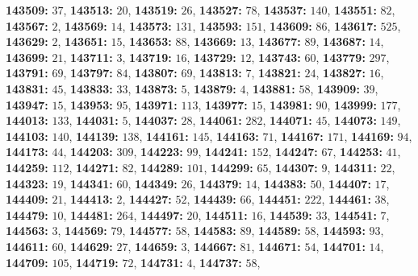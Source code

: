 \textsf{\bfseries 143509:} $37$, \textsf{\bfseries 143513:} $20$, \textsf{\bfseries 143519:} $26$, \textsf{\bfseries 143527:} $78$, \textsf{\bfseries 143537:} $140$, \textsf{\bfseries 143551:} $82$, \textsf{\bfseries 143567:} $2$, \textsf{\bfseries 143569:} $14$, \textsf{\bfseries 143573:} $131$, \textsf{\bfseries 143593:} $151$, \textsf{\bfseries 143609:} $86$, \textsf{\bfseries 143617:} $525$, \textsf{\bfseries 143629:} $2$, \textsf{\bfseries 143651:} $15$, \textsf{\bfseries 143653:} $88$, \textsf{\bfseries 143669:} $13$, \textsf{\bfseries 143677:} $89$, \textsf{\bfseries 143687:} $14$, \textsf{\bfseries 143699:} $21$, \textsf{\bfseries 143711:} $3$, \textsf{\bfseries 143719:} $16$, \textsf{\bfseries 143729:} $12$, \textsf{\bfseries 143743:} $60$, \textsf{\bfseries 143779:} $297$, \textsf{\bfseries 143791:} $69$, \textsf{\bfseries 143797:} $84$, \textsf{\bfseries 143807:} $69$, \textsf{\bfseries 143813:} $7$, \textsf{\bfseries 143821:} $24$, \textsf{\bfseries 143827:} $16$, \textsf{\bfseries 143831:} $45$, \textsf{\bfseries 143833:} $33$, \textsf{\bfseries 143873:} $5$, \textsf{\bfseries 143879:} $4$, \textsf{\bfseries 143881:} $58$, \textsf{\bfseries 143909:} $39$, \textsf{\bfseries 143947:} $15$, \textsf{\bfseries 143953:} $95$, \textsf{\bfseries 143971:} $113$, \textsf{\bfseries 143977:} $15$, \textsf{\bfseries 143981:} $90$, \textsf{\bfseries 143999:} $177$, \textsf{\bfseries 144013:} $133$, \textsf{\bfseries 144031:} $5$, \textsf{\bfseries 144037:} $28$, \textsf{\bfseries 144061:} $282$, \textsf{\bfseries 144071:} $45$, \textsf{\bfseries 144073:} $149$, \textsf{\bfseries 144103:} $140$, \textsf{\bfseries 144139:} $138$, \textsf{\bfseries 144161:} $145$, \textsf{\bfseries 144163:} $71$, \textsf{\bfseries 144167:} $171$, \textsf{\bfseries 144169:} $94$, \textsf{\bfseries 144173:} $44$, \textsf{\bfseries 144203:} $309$, \textsf{\bfseries 144223:} $99$, \textsf{\bfseries 144241:} $152$, \textsf{\bfseries 144247:} $67$, \textsf{\bfseries 144253:} $41$, \textsf{\bfseries 144259:} $112$, \textsf{\bfseries 144271:} $82$, \textsf{\bfseries 144289:} $101$, \textsf{\bfseries 144299:} $65$, \textsf{\bfseries 144307:} $9$, \textsf{\bfseries 144311:} $22$, \textsf{\bfseries 144323:} $19$, \textsf{\bfseries 144341:} $60$, \textsf{\bfseries 144349:} $26$, \textsf{\bfseries 144379:} $14$, \textsf{\bfseries 144383:} $50$, \textsf{\bfseries 144407:} $17$, \textsf{\bfseries 144409:} $21$, \textsf{\bfseries 144413:} $2$, \textsf{\bfseries 144427:} $52$, \textsf{\bfseries 144439:} $66$, \textsf{\bfseries 144451:} $222$, \textsf{\bfseries 144461:} $38$, \textsf{\bfseries 144479:} $10$, \textsf{\bfseries 144481:} $264$, \textsf{\bfseries 144497:} $20$, \textsf{\bfseries 144511:} $16$, \textsf{\bfseries 144539:} $33$, \textsf{\bfseries 144541:} $7$, \textsf{\bfseries 144563:} $3$, \textsf{\bfseries 144569:} $79$, \textsf{\bfseries 144577:} $58$, \textsf{\bfseries 144583:} $89$, \textsf{\bfseries 144589:} $58$, \textsf{\bfseries 144593:} $93$, \textsf{\bfseries 144611:} $60$, \textsf{\bfseries 144629:} $27$, \textsf{\bfseries 144659:} $3$, \textsf{\bfseries 144667:} $81$, \textsf{\bfseries 144671:} $54$, \textsf{\bfseries 144701:} $14$, \textsf{\bfseries 144709:} $105$, \textsf{\bfseries 144719:} $72$, \textsf{\bfseries 144731:} $4$, \textsf{\bfseries 144737:} $58$, 
